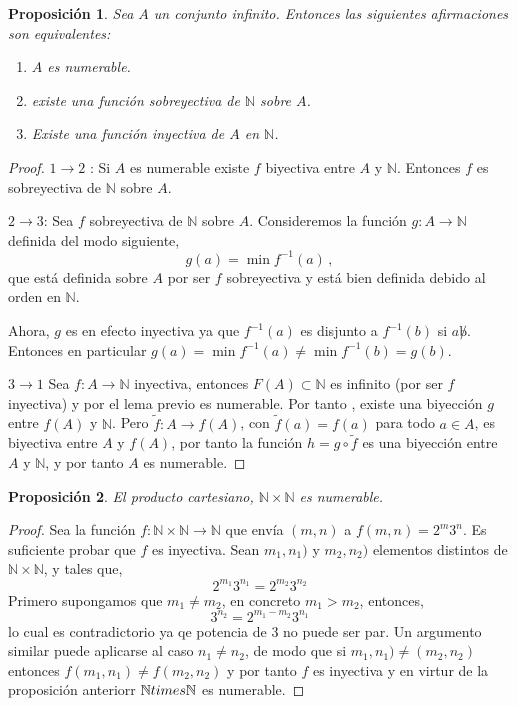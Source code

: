 \documentclass[12pt]{book}
\newtheorem{prop}{\bf Proposición}[chapter]
\def\NN{\mathbb{N}}
\begin{document}
\begin{prop} Sea $A$ un conjunto infinito.  Entonces las siguientes afirmaciones son equivalentes:
\begin{enumerate}
\item $A$ es numerable.
\item existe una función sobreyectiva de $\NN$ sobre  $A$.
\item Existe una función inyectiva de $A$ en $\NN$.
\end{enumerate}
\end{prop}
\begin{proof}
\noindent$1\to2$ : Si $A$ es numerable existe $f$ biyectiva entre $A$ y $\NN$. Entonces $f$ es 
sobreyectiva de $\NN$ sobre $A$.

\noindent$2\to3$: Sea $f$ sobreyectiva de $\NN$ sobre $A$. Consideremos la función $g: 
A\longrightarrow \NN$ definida del modo siguiente, 
$$g(a)=\min  f^{-1}(a)\,,$$
 que  está definida sobre $A$ por ser $f$ sobreyectiva y  está bien definida debido al orden en $
\NN$.

Ahora,  $g$ es en efecto inyectiva ya que $f^{-1}(a)$ es disjunto a $f^{-1}(b)$ si $a\not b$. 
Entonces en particular $g(a)=\min f^{-1}(a)\not=\min f^{-1}(b)=g(b)$.


\noindent$3\to1$ Sea  $f: A\longrightarrow \NN$ inyectiva, entonces $F(A)\subset \NN$ es infinito 
(por ser $f$ inyectiva)  y por el lema previo es numerable. Por tanto , existe una biyección $g$ 
entre $f(A)$ y $\NN$. Pero $\tilde{f}:A\longrightarrow f(A)$, con $\tilde f (a)=f(a)$ para todo $a\in 
A$, es biyectiva entre $A$ y $f(A)$, por tanto la  función  $h=g\circ  \tilde f$ es una biyección entre  
$A$  y $\NN$, y por tanto $A$ es numerable.
\end{proof}
\begin{prop}
El producto  cartesiano, $\NN\times\NN$ es numerable.
\end{prop}
\begin{proof}
Sea la función $f:\NN\times\NN\longrightarrow\NN$ que envía $(m,n)$ a $f(m,n)=2^m3^n$. Es 
suficiente probar que $f$ es inyectiva.
Sean $m_1,n_1)$ y $m_2,n_2)$ elementos distintos de $\NN\times\NN$, y tales que,
$$2^{m_1}3^{n_1}=2^{m_2}3^{n_2}$$
Primero supongamos que $m_1\not=m_2$, en concreto $m_1>m_2$, entonces,
$$3^{n_2}=2^{m_1-m_2} 3^{n_1}$$
lo cual es contradictorio ya qe potencia de $3$ no puede ser par. Un argumento similar puede 
aplicarse  al caso $n_1\not=n_2$, de modo que si  $m_1,n_1)\not=(m_2,n_2)$ entonces 
$f(m_1,n_1)\not=f(m_2,n_2)$ y por tanto $f$ es inyectiva y en virtur de la proposición anteriorr $
\NN\\times\NN$  es numerable.
\end{proof}
\end{document}
